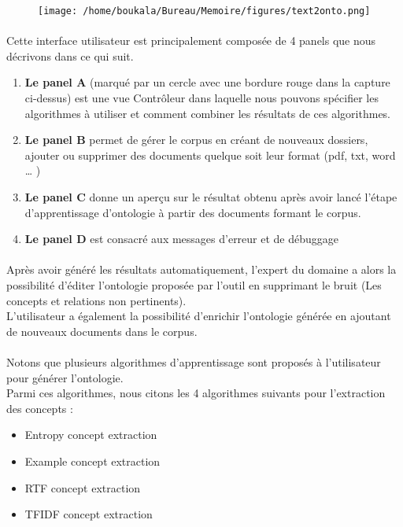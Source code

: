\documentclass[12pt, a4paper, oneside]{book}
\begin{document}
\begin{figure}[h!]
\begin{center}
\texttt{[image: /home/boukala/Bureau/Memoire/figures/text2onto.png]}
\end{center}
\end{figure}
 

\paragraph{}
Cette interface utilisateur est principalement composée de 4 panels que nous décrivons dans ce qui suit.

\begin{enumerate}
\item \textbf{Le panel A} (marqué par un cercle avec une bordure rouge dans la capture ci-dessus) est une vue Contrôleur dans laquelle nous pouvons spécifier les algorithmes à utiliser et comment combiner les résultats de ces algorithmes.

\item \textbf{Le panel B} permet de gérer le corpus en créant de nouveaux dossiers, ajouter ou supprimer des documents quelque soit leur format (pdf, txt, word … )

\item \textbf{Le panel C} donne un aperçu sur le résultat obtenu après avoir lancé l'étape d'apprentissage d'ontologie à partir des documents formant le corpus.

\item \textbf{Le panel D} est consacré aux messages d'erreur et de débuggage 

\end{enumerate}
\paragraph{}
Après avoir généré les résultats automatiquement, l'expert du domaine a alors la possibilité d'éditer l'ontologie proposée par l'outil en supprimant le bruit (Les concepts et relations non pertinents).\\ L'utilisateur a également la possibilité d'enrichir l'ontologie générée en ajoutant de nouveaux documents dans le corpus.
\paragraph{}
Notons que plusieurs algorithmes d'apprentissage sont proposés à l'utilisateur pour générer l'ontologie.\\
Parmi ces algorithmes, nous citons les 4 algorithmes suivants pour l'extraction des concepts :\\
\begin{itemize}
\item Entropy concept extraction
\item Example concept extraction
\item RTF concept extraction
\item TFIDF concept extraction

\end{itemize}
\end{document}
